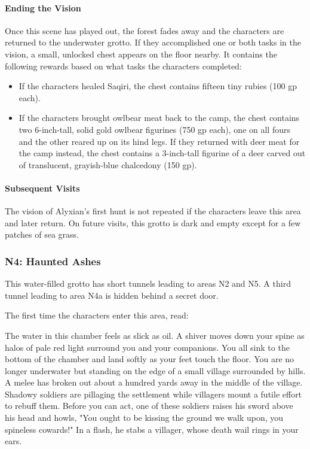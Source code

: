 \documentclass[letterpaper, 11pt, bg=full, twocolumn]{dndbook}
\begin{document}
\paragraph{Ending the Vision}

Once this scene has played out, the forest fades away and the characters are returned to the underwater grotto. If they accomplished one or both tasks in the vision, a small, unlocked chest appears on the floor nearby. It contains the following rewards based on what tasks the characters completed:

\begin{itemize}
\item If the characters healed Saqiri, the chest contains fifteen tiny rubies (100 gp each).
\item If the characters brought owlbear meat back to the camp, the chest contains two 6-inch-tall, solid gold owlbear figurines (750 gp each), one on all fours and the other reared up on its hind legs. If they returned with deer meat for the camp instead, the chest contains a 3-inch-tall figurine of a deer carved out of translucent, grayish-blue chalcedony (150 gp).
\end{itemize}

\paragraph{Subsequent Visits}

The vision of Alyxian's first hunt is not repeated if the characters leave this area and later return. On future visits, this grotto is dark and empty except for a few patches of sea grass.

\subsubsection{N4: Haunted Ashes}

This water-filled grotto has short tunnels leading to areas N2 and N5. A third tunnel leading to area N4a is hidden behind a secret door.

The first time the characters enter this area, read:

\begin{DndReadAloud}
The water in this chamber feels as slick as oil. A shiver moves down your spine as halos of pale red light surround you and your companions. You all sink to the bottom of the chamber and land softly as your feet touch the floor.
You are no longer underwater but standing on the edge of a small village surrounded by hills. A melee has broken out about a hundred yards away in the middle of the village. Shadowy soldiers are pillaging the settlement while villagers mount a futile effort to rebuff them. Before you can act, one of these soldiers raises his sword above his head and howls, "You ought to be kissing the ground we walk upon, you spineless cowards!" In a flash, he stabs a villager, whose death wail rings in your ears.
\end{DndReadAloud}
\end{document}
